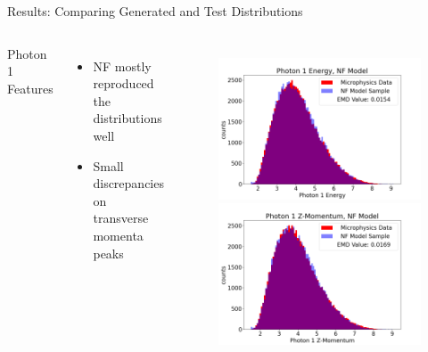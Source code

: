 \documentclass[aspectratio=169]{beamer}
\begin{document}
\begin{frame}{Results: Comparing Generated and Test Distributions}
   \begin{columns}
            Photon 1 Features
            \begin{itemize}
                    \setlength\itemsep{0.3em}
                    \item NF mostly reproduced the distributions well
                    \item Small discrepancies on transverse momenta peaks
            \end{itemize}
   
            \begin{figure}[H]
            \centering
            \includegraphics[width=.97\textwidth]{images/Features16/Photon_1_Energy,_NF_Model.png}
            \includegraphics[width=.97\textwidth]{images/Features16/Photon_1_Z-Momentum,_NF_Model.png}
            \label{fig:clas6}
            \end{figure}
            

\end{columns}
\end{frame}
\end{document}
